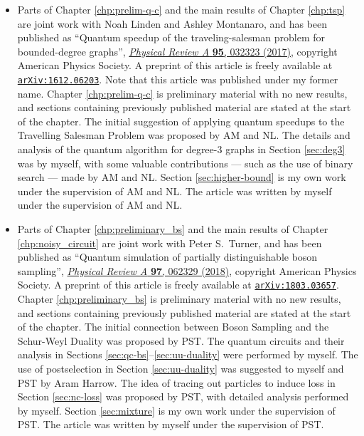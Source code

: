 \begin{itemize}
\item Parts of Chapter \ref{chp:prelim-q-c} and the main results of Chapter \ref{chp:tsp} are joint work with Noah Linden and Ashley Montanaro, and has been published as ``Quantum speedup of the traveling-salesman problem for bounded-degree graphs'', \href{https://link.aps.org/doi/10.1103/PhysRevA.95.032323}{\textit{Physical Review A} \textbf{95}, 032323 (2017)}, copyright American Physics Society. A preprint of this article is freely available at {\tt \href{https://arxiv.org/abs/1612.06203}{arXiv:1612.06203}}. Note that this article was published under my former name. Chapter \ref{chp:prelim-q-c} is preliminary material with no new results, and sections containing previously published material are stated at the start of the chapter. The initial suggestion of applying quantum speedups to the Travelling Salesman Problem was proposed by AM and NL. The details and analysis of the quantum algorithm for degree-3 graphs in Section \ref{sec:deg3} was by myself, with some valuable contributions --- such as the use of binary search --- made by AM and NL. Section \ref{sec:higher-bound} is my own work under the supervision of AM and NL. The article was written by myself under the supervision of AM and NL.

\item Parts of Chapter \ref{chp:preliminary_bs} and the main results of Chapter \ref{chp:noisy_circuit} are joint work with Peter S.\ Turner, and has been published as ``Quantum simulation of partially distinguishable boson sampling'', \href{https://link.aps.org/doi/10.1103/PhysRevA.97.062329}{\textit{Physical Review A} \textbf{97}, 062329 (2018)}, copyright American Physics Society. A preprint of this article is freely available at {\tt \href{https://arxiv.org/abs/1803.03657}{arXiv:1803.03657}}. Chapter \ref{chp:preliminary_bs} is preliminary material with no new results, and sections containing previously published material are stated at the start of the chapter. The initial connection between Boson Sampling and the Schur-Weyl Duality was proposed by PST. The quantum circuits and their analysis in Sections \ref{sec:qc-bs}--\ref{sec:uu-duality} were performed by myself. The use of postselection in Section \ref{sec:uu-duality} was suggested to myself and PST by Aram Harrow. The idea of tracing out particles to induce loss in Section \ref{sec:nc-loss} was proposed by PST, with detailed analysis performed by myself. Section \ref{sec:mixture} is my own work under the supervision of PST. The article was written by myself under the supervision of PST.


\end{itemize}
